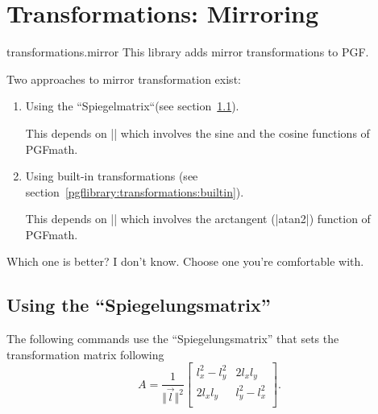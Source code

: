 %
%
%

\section{Transformations: Mirroring}
\label{pgflibrary:transformations}

\begin{pgflibrary}{transformations.mirror}
  This library adds mirror transformations to PGF.
\end{pgflibrary}

Two approaches to mirror transformation exist:
\begin{enumerate}
\item Using the ``Spiegelmatrix``(see section~\ref{pgflibrary:transformations:spiegelungsmatrix}).

  This depends on |\pgfpointnormalised| which involves the sine and the cosine functions of PGFmath.

\item Using built-in transformations (see section~\ref{pgflibrary:transformations:builtin}).

  This depends on |\pgfmathanglebetween| which involves the arctangent (|atan2|) function of PGFmath.
\end{enumerate}

Which one is better? I don't know.
Choose one you're comfortable with.

\subsection{Using the ``Spiegelungsmatrix''}
\label{pgflibrary:transformations:spiegelungsmatrix}

The following commands use the ``Spiegelungsmatrix'' that sets the transformation matrix following
\begin{equation*}
  A = \frac{1}{\Vert\vec l\Vert^2} \begin{bmatrix}
  l_x^2-l_y^2 & 2l_xl_y \\
  2l_xl_y & l_y^2-l_x^2\\
  \end{bmatrix}.
\end{equation*}


